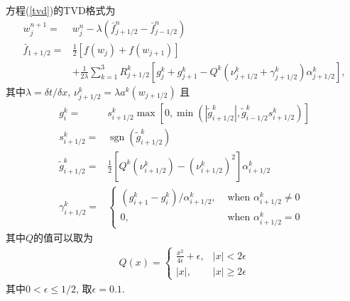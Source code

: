 \documentclass[10.5pt
]{article}
\begin{document}
方程(\ref{tvd})的TVD格式为\citep{Harten1983}
\begin{align}
w_{j}^{n+1}=&w_{j}^{n}-\lambda\left(\bar{f}_{j+1 / 2}^{n}-\bar{f}_{j-1 / 2}^{n}\right)
\\
\bar{f}_{1+1 / 2}=&
\frac{1}{2}\left[f\left(w_{j}\right)+f\left(w_{j+1}\right)\right] \nonumber
\\ &+\frac{1}{2 \lambda} \sum_{k=1}^{3} R_{j+1 / 2}^{k}\left[g_{j}^{k}+g_{j+1}^{k}-Q^{k}\left(\nu_{j+1 / 2}^{k}+\gamma_{j+1 / 2}^{k}\right) \alpha_{j+1 / 2}^{k}\right],
\end{align}
其中$\lambda=\delta t/\delta x$, $\nu_{j+1 / 2}^{k}=\lambda a^k(w_{j+1/2})$ 且
\begin{align}
g_{i}^{k}=& s_{i+1 / 2}^{k} \max \left[0, \min \left(\left|\tilde{g}_{i+1 / 2}^{k}\right|, \tilde{g}_{i-1 / 2}^{k} s_{i+1 / 2}^{k}\right)\right] \\
s_{i+1 / 2}^{k}=&\operatorname{sgn}\left(\tilde{g}_{i+1 / 2}^{k}\right) \\ 
\tilde{g}_{i+1 / 2}^{k}=&\frac{1}{2}\left[Q^{k}\left(\nu_{i+1 / 2}^{k}\right)-\left(\nu_{i+1 / 2}^{k}\right)^{2}\right] \alpha_{i+1 / 2}^{k} \\ 
\gamma_{i+1 / 2}^{k}=&\left\{\begin{array}{ll}{\left(g_{i+1}^{k}-g_{i}^{k}\right) / \alpha_{i+1 / 2}^{k},} & {\text { when } \alpha_{i+1 / 2}^{k} \neq 0} \\ {0,} & {\text { when } \alpha_{i+1 / 2}^{k}=0}\end{array}\right.
\end{align}
其中$Q$的值可以取为
\begin{align}
Q(x)=\left\{\begin{array}{ll}{\frac{x^{2}}{4 \epsilon}+\epsilon,} & {|x|<2 \epsilon} \\ {|x|,} & {|x| \geq 2 \epsilon}\end{array}\right.
\end{align}
其中$0< \epsilon \leq 1/2$, 取$\epsilon=0.1$.
\end{document}
